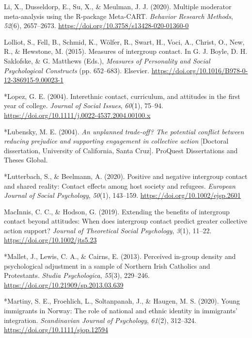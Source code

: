 \documentclass[12pt, letterpaper]{article}
\newenvironment{CSLReferences}[2]{}{}
\begin{document}
\begin{CSLReferences}{1}{0}
\leavevmode\hypertarget{ref-li_multiple_2020}{}%
Li, X., Dusseldorp, E., Su, X., \& Meulman, J. J. (2020). Multiple
moderator meta-analysis using the {R}-package {Meta}-{CART}.
\emph{Behavior Research Methods}, \emph{52}(6), 2657--2673.
\url{https://doi.org/10.3758/s13428-020-01360-0}

\leavevmode\hypertarget{ref-lolliot_measures_2015}{}%
Lolliot, S., Fell, B., Schmid, K., Wölfer, R., Swart, H., Voci, A.,
Christ, O., New, R., \& Hewstone, M. (2015). Measures of intergroup
contact. In G. J. Boyle, D. H. Saklofske, \& G. Matthews (Eds.),
\emph{Measures of {Personality} and {Social} {Psychological}
{Constructs}} (pp. 652--683). Elsevier.
\url{https://doi.org/10.1016/B978-0-12-386915-9.00023-1}

\leavevmode\hypertarget{ref-1042}{}%
*Lopez, G. E. (2004). Interethnic contact, curriculum, and attitudes in
the first year of college. \emph{Journal of Social Issues},
\emph{60}(1), 75--94.
\url{https://doi.org/10.1111/j.0022-4537.2004.00100.x}

\leavevmode\hypertarget{ref-894}{}%
*Lubensky, M. E. (2004). \emph{An unplanned trade-off? The potential
conflict between reducing prejudice and supporting engagement in
collective action} {[}Doctoral dissertation, University of California,
Santa Cruz{]}. {ProQuest Dissertations and Theses Global}.

\leavevmode\hypertarget{ref-4000}{}%
*Lutterbach, S., \& Beelmann, A. (2020). Positive and negative
intergroup contact and shared reality: {Contact} effects among host
society and refugees. \emph{European Journal of Social Psychology},
\emph{50}(1), 143--159. \url{https://doi.org/10.1002/ejsp.2601}

\leavevmode\hypertarget{ref-macinnis_extending_2019}{}%
MacInnis, C. C., \& Hodson, G. (2019). Extending the benefits of
intergroup contact beyond attitudes: {When} does intergroup contact
predict greater collective action support? \emph{Journal of Theoretical
Social Psychology}, \emph{3}(1), 11--22.
\url{https://doi.org/10.1002/jts5.23}

\leavevmode\hypertarget{ref-893}{}%
*Mallet, J., Lewis, C. A., \& Cairns, E. (2013). Perceived in-group
density and psychological adjustment in a sample of {Northern} {Irish}
{Catholics} and {Protestants}. \emph{Studia Psychologica}, \emph{55}(3),
229--246. \url{https://doi.org/10.21909/sp.2013.03.639}

\leavevmode\hypertarget{ref-3005}{}%
*Martiny, S. E., Froehlich, L., Soltanpanah, J., \& Haugen, M. S.
(2020). Young immigrants in {Norway}: {The} role of national and ethnic
identity in immigrants' integration. \emph{Scandinavian Journal of
Psychology}, \emph{61}(2), 312--324.
\url{https://doi.org/10.1111/sjop.12594}


\end{CSLReferences}
\end{document}
